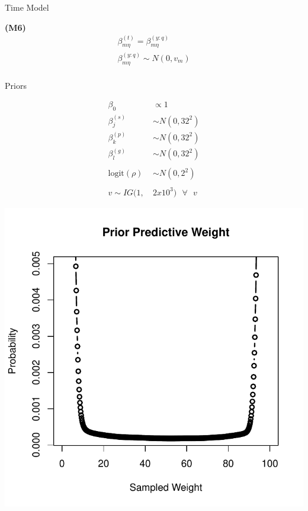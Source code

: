 \documentclass[ xcolor = pdftex, dvipsnames, table ]{beamer}
\begin{document}
\begin{frame}{Time Model}
\begin{minipage}{0.3\textwidth}
\begin{center}
\textbf{(M6)}
\begin{eqnarray*}
&\beta^{(t)}_{m\eta} = \beta^{(y:q)}_{m\eta}&\\
&\beta^{(y:q)}_{m\eta} \sim N(0, v_m)&\\
&&
\end{eqnarray*}
\end{center}
\end{minipage}
\end{frame}

%
%

\begin{frame}{Priors}
$~$
\hspace*{-1.5cm}
\begin{minipage}{0.55\textwidth}
\begin{align*}
\beta_0 &\propto 1\\
\beta^{(s)}_j &\sim N(0, 32^2)\\
\beta^{(p)}_k &\sim N(0, 32^2)\\
\beta^{(g)}_l &\sim N(0, 32^2)\\
&\\
\text{logit}(\rho) &\sim N(0, 2^2)\\
&\\
v\sim IG(1,~&2x10^{3}) ~~~\forall~~~v 
\end{align*}
\end{minipage}
\begin{minipage}{0.4\textwidth}       
\includegraphics[width=1.4\textwidth]{../pictures/priorPredict.pdf}
\end{minipage}
\end{frame}
\end{document}
